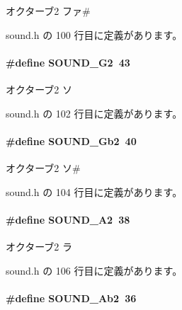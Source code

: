 オクターブ2 ファ\# 



 sound.\+h の 100 行目に定義があります。

\paragraph[{S\+O\+U\+N\+D\+\_\+\+G2}]{\setlength{\rightskip}{0pt plus 5cm}\#define S\+O\+U\+N\+D\+\_\+\+G2~43}\label{sound_8h_add206c6691e048cc1ce70f995384dbb8_add206c6691e048cc1ce70f995384dbb8}


オクターブ2 ソ 



 sound.\+h の 102 行目に定義があります。

\paragraph[{S\+O\+U\+N\+D\+\_\+\+Gb2}]{\setlength{\rightskip}{0pt plus 5cm}\#define S\+O\+U\+N\+D\+\_\+\+Gb2~40}\label{sound_8h_a73fd8b78bb50cd9cdbd8a1c09400262d_a73fd8b78bb50cd9cdbd8a1c09400262d}


オクターブ2 ソ\# 



 sound.\+h の 104 行目に定義があります。

\paragraph[{S\+O\+U\+N\+D\+\_\+\+A2}]{\setlength{\rightskip}{0pt plus 5cm}\#define S\+O\+U\+N\+D\+\_\+\+A2~38}\label{sound_8h_a87cc8e430711a16f8d53adec0fc30863_a87cc8e430711a16f8d53adec0fc30863}


オクターブ2 ラ 



 sound.\+h の 106 行目に定義があります。

\paragraph[{S\+O\+U\+N\+D\+\_\+\+Ab2}]{\setlength{\rightskip}{0pt plus 5cm}\#define S\+O\+U\+N\+D\+\_\+\+Ab2~36}\label{sound_8h_aa355b76cc29205f9fdd6edd04802baa1_aa355b76cc29205f9fdd6edd04802baa1}


